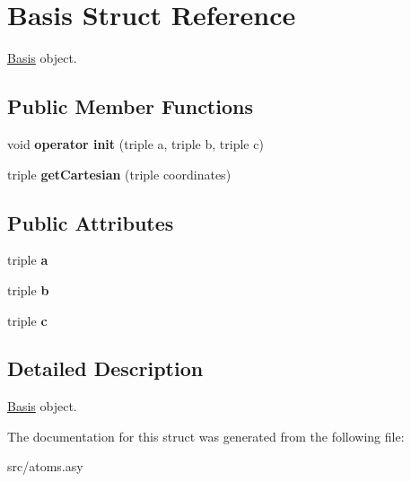 \hypertarget{structBasis}{\section{Basis Struct Reference}
\label{structBasis}
}


\hyperlink{structBasis}{Basis} object.  


\subsection*{Public Member Functions}
\begin{DoxyCompactItemize}
\item 
\hypertarget{structBasis_acf3db108dcecab44102a4c54556ac907}{void {\bfseries operator init} (triple a, triple b, triple c)}\label{structBasis_acf3db108dcecab44102a4c54556ac907}

\item 
\hypertarget{structBasis_a36f15c6bc34d20bf009e43ed42337956}{triple {\bfseries get\+Cartesian} (triple coordinates)}\label{structBasis_a36f15c6bc34d20bf009e43ed42337956}

\end{DoxyCompactItemize}
\subsection*{Public Attributes}
\begin{DoxyCompactItemize}
\item 
\hypertarget{structBasis_aa1859f20d91a29f29752197c97144102}{triple {\bfseries a}}\label{structBasis_aa1859f20d91a29f29752197c97144102}

\item 
\hypertarget{structBasis_aa336343187b6cf4745a78b1dc2992e32}{triple {\bfseries b}}\label{structBasis_aa336343187b6cf4745a78b1dc2992e32}

\item 
\hypertarget{structBasis_a190e40eadc3a8c8cefd18bdd28c229c0}{triple {\bfseries c}}\label{structBasis_a190e40eadc3a8c8cefd18bdd28c229c0}

\end{DoxyCompactItemize}


\subsection{Detailed Description}
\hyperlink{structBasis}{Basis} object. 

The documentation for this struct was generated from the following file\+:\begin{DoxyCompactItemize}
\item 
src/atoms.\+asy\end{DoxyCompactItemize}
